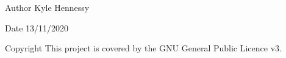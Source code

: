 \begin{DoxyAuthor}{Author}
Kyle Hennessy 
\end{DoxyAuthor}
\begin{DoxyDate}{Date}
13/11/2020 
\end{DoxyDate}
\begin{DoxyCopyright}{Copyright}
This project is covered by the G\+NU General Public Licence v3. 
\end{DoxyCopyright}
